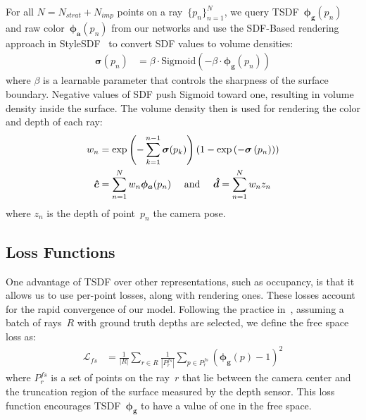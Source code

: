 For all $N=N_{strat}+N_{imp}$ points on a ray~$\{p_{n}\}_{n=1}^{N}$, we query TSDF~$\boldsymbol{\phi_{g}}(p_{n})$ and raw color~$\boldsymbol{\phi_{a}}(p_{n})$ from our networks and use the SDF-Based rendering approach in StyleSDF~\citep{or2022stylesdf} to convert SDF values to volume densities:
\begin{align}
	\boldsymbol{\sigma}(p_{n}) &= \beta \cdot \text{Sigmoid} \left(-\beta \cdot \boldsymbol{\phi_{g}}(p_{n}) \right)
\end{align}
where $\beta$ is a learnable parameter that controls the sharpness of the surface boundary. Negative values of SDF push Sigmoid toward one, resulting in volume density inside the surface. The volume density then is used for rendering the color and depth of each ray:
\begin{align}
    w_{n} &= \exp \left( -\sum_{k=1}^{n-1} \boldsymbol{\sigma}(p_{k}) \right) \left( 1 - \exp \left(-\boldsymbol{\sigma}\left(p_{n}\right) \right)\right) \notag 
    \\
	\boldsymbol{\hat{c}} &= \sum_{n=1}^{N} w_{n} \boldsymbol{\phi_{a}}(p_{n}) \text{\phantom{00} and \phantom{00}} \boldsymbol{\hat{d}} = \sum_{n=1}^{N} w_{n} z_{n}
\end{align}
where $z_{n}$ is the depth of point~$p_{n}$ \wrt the camera pose.

\subsection{Loss Functions} \label{sec:c4_losses}
One advantage of TSDF over other representations, such as occupancy, is that it allows us to use per-point losses, along with rendering ones. These losses account for the rapid convergence of our model. Following the practice in~\cite{azinovic2022neural}, assuming a batch of rays~$R$ with ground truth depths are selected, we define the free space loss as:
\begin{align}
	\mathcal{L}_{fs} &= \frac{1}{|R|} \sum_{r \in R} \frac{1}{|P_{r}^{fs}|} \sum_{p \in P_{r}^{fs}} (\boldsymbol{\phi_{g}}(p) - 1)^2
\end{align}
where $P_{r}^{fs}$ is a set of points on the ray~$r$ that lie between the camera center and the truncation region of the surface measured by the depth sensor. This loss function encourages TSDF~$\boldsymbol{\phi_{g}}$ to have a value of one in the free space.


